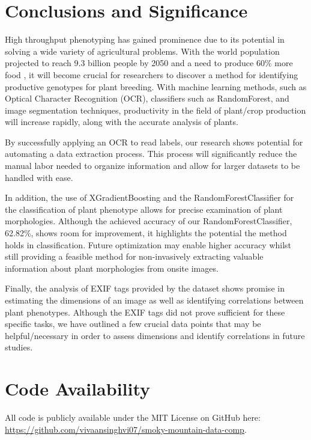 \documentclass[final,5p,times,twocolumn,authoryear]{elsarticle}
\begin{document}
\section{Conclusions and Significance}

High throughput phenotyping has gained prominence due to its potential in solving a wide variety of agricultural problems. With the world population projected to reach 9.3 billion people by 2050 and a need to produce 60\% more food \citep{silva2012feeding}, it will become crucial for researchers to discover a method for identifying productive genotypes for plant breeding.  With machine learning methods, such as Optical Character Recognition (OCR), classifiers such as RandomForest, and image segmentation techniques,  productivity in the field of plant/crop production will increase rapidly, along with the accurate analysis of plants. 

By successfully applying an OCR to read labels, our research shows potential for automating a data extraction process.  This process will significantly reduce the manual labor needed to organize information and allow for larger datasets to be handled with ease. 

In addition, the use of XGradientBoosting and the RandomForestClassifier for the classification of plant phenotype allows for precise examination of plant morphologies. Although the achieved accuracy of our RandomForestClassifier, 62.82\%, shows room for improvement, it highlights the potential the method holds in classification. Future optimization may enable higher accuracy whilst still providing a feasible method for non-invasively extracting valuable information about plant morphologies from onsite images. 

Finally, the analysis of EXIF tags provided by the dataset shows promise in estimating the dimensions of an image as well as identifying correlations between plant phenotypes. Although the EXIF tags did not prove sufficient for these specific tasks, we have outlined a few crucial data points that may be helpful/necessary in order to assess dimensions and identify correlations in future studies. 


\section{Code Availability}
\label{code}

All code is publicly available under the MIT License on GitHub here: \url{https://github.com/vivaansinghvi07/smoky-mountain-data-comp}.
\end{document}

